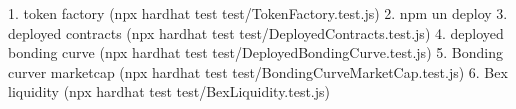 1. token factory (npx hardhat test test/TokenFactory.test.js)
2. npm un deploy 
3. deployed contracts (npx hardhat test test/DeployedContracts.test.js)
4. deployed bonding curve (npx hardhat test test/DeployedBondingCurve.test.js)
5. Bonding curver marketcap (npx hardhat test test/BondingCurveMarketCap.test.js)
6. Bex liquidity (npx hardhat test test/BexLiquidity.test.js)
